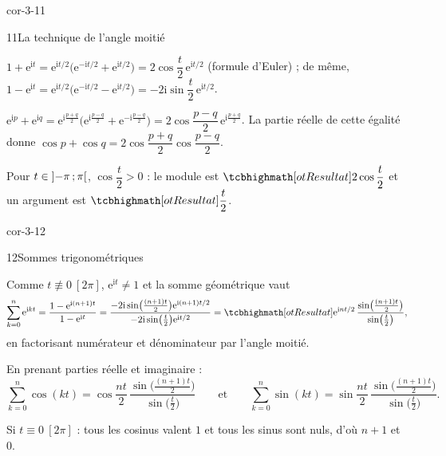 \begin{blocLivre}{cor-3-11}
\begin{corrige}{11}{La technique de l'angle moitié}
\begin{questions}
  \item $1+\mathrm{e}^{\mathrm{i}t}
    =\mathrm{e}^{\mathrm{i}t/2}\bigl(\mathrm{e}^{-\mathrm{i}t/2}+\mathrm{e}^{\mathrm{i}t/2}\bigr)
    =2\cos\dfrac{t}{2}\,\mathrm{e}^{\mathrm{i}t/2}$ (formule d'Euler) ; de même,
    $1-\mathrm{e}^{\mathrm{i}t}
    =\mathrm{e}^{\mathrm{i}t/2}\bigl(\mathrm{e}^{-\mathrm{i}t/2}-\mathrm{e}^{\mathrm{i}t/2}\bigr)
    =-2\mathrm{i}\sin\dfrac{t}{2}\,\mathrm{e}^{\mathrm{i}t/2}$.
  \item $\mathrm{e}^{\mathrm{i}p}+\mathrm{e}^{\mathrm{i}q}
    =\mathrm{e}^{\mathrm{i}\frac{p+q}{2}}
    \bigl(\mathrm{e}^{\mathrm{i}\frac{p-q}{2}}+\mathrm{e}^{-\mathrm{i}\frac{p-q}{2}}\bigr)
    =2\cos\dfrac{p-q}{2}\,\mathrm{e}^{\mathrm{i}\frac{p+q}{2}}$.
    La partie réelle de cette égalité donne
    $\cos p+\cos q=2\cos\dfrac{p+q}{2}\cos\dfrac{p-q}{2}$.
  \item Pour $t\in\mathopen{]}-\pi\,{;}\,\pi\mathclose{[}$, $\cos\dfrac{t}{2}>0$ : le module est
    $\res{2\cos\dfrac{t}{2}}$ et un argument est $\res{\dfrac{t}{2}}$.
\end{questions}
\end{corrige}
\end{blocLivre}

\begin{blocLivre}{cor-3-12}
\begin{corrige}{12}{Sommes trigonométriques}
\begin{questions}
  \item Comme $t\not\equiv0\ [2\pi]$, $\mathrm{e}^{\mathrm{i}t}\neq1$ et la somme
    géométrique vaut
    \[
      \sum_{k=0}^{n}\mathrm{e}^{\mathrm{i}kt}
      =\frac{1-\mathrm{e}^{\mathrm{i}(n+1)t}}{1-\mathrm{e}^{\mathrm{i}t}}
      =\frac{-2\mathrm{i}\sin\bigl(\frac{(n+1)t}{2}\bigr)\mathrm{e}^{\mathrm{i}(n+1)t/2}}
            {-2\mathrm{i}\sin\bigl(\frac{t}{2}\bigr)\mathrm{e}^{\mathrm{i}t/2}}
      =\res{\mathrm{e}^{\mathrm{i}nt/2}\,
        \frac{\sin\bigl(\frac{(n+1)t}{2}\bigr)}{\sin\bigl(\frac{t}{2}\bigr)}},
    \]
    en factorisant numérateur et dénominateur par l'angle moitié.
  \item En prenant parties réelle et imaginaire :
    \[
      \sum_{k=0}^{n}\cos(kt)=\cos\frac{nt}{2}\,
        \frac{\sin\bigl(\frac{(n+1)t}{2}\bigr)}{\sin\bigl(\frac{t}{2}\bigr)}
      \qquad\text{et}\qquad
      \sum_{k=0}^{n}\sin(kt)=\sin\frac{nt}{2}\,
        \frac{\sin\bigl(\frac{(n+1)t}{2}\bigr)}{\sin\bigl(\frac{t}{2}\bigr)}.
    \]
  \item Si $t\equiv0\ [2\pi]$ : tous les cosinus valent $1$ et tous les sinus
    sont nuls, d'où $n+1$ et $0$.
\end{questions}
\end{corrige}
\end{blocLivre}

